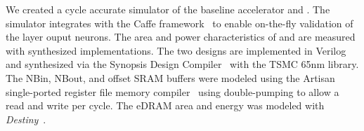 %
%
We created a cycle accurate simulator of the baseline accelerator and \ZF. 
The simulator integrates with the Caffe framework~\cite{caffe} to enable on-the-fly validation of the layer ouput neurons. 
%
%
%
%
The area and power characteristics of \ZF and \BASE are measured 
with synthesized implementations. The two designs are implemented 
in Verilog and synthesized via the Synopsis Design 
Compiler~\cite{synopsys_site} with the TSMC 65nm library. 
The NBin, NBout, and \ZF offset SRAM buffers were modeled using 
the Artisan single-ported register file memory compiler~\cite{artisan} 
using double-pumping to allow a read and write per cycle. The eDRAM 
area and energy was modeled with \textit{Destiny}~\cite{destiny}.
%



%
%
%
%
%

%
%

%
%
%
%

%
%
%
%
%
%
%
%
%
%
%
%
%
